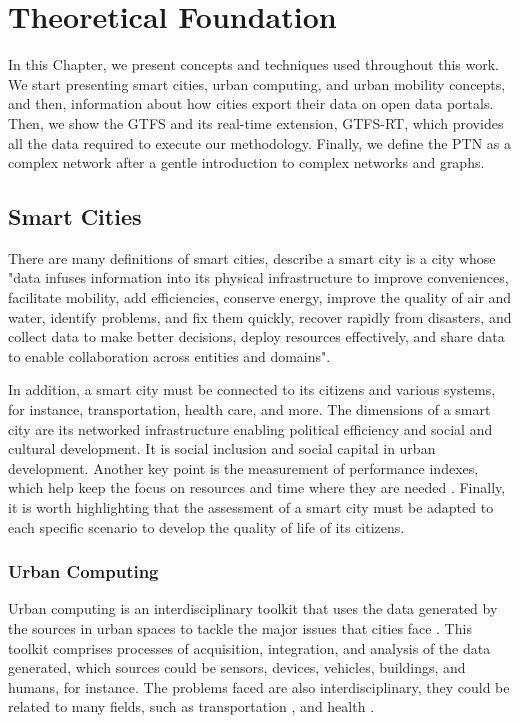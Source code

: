 \chapter{Theoretical Foundation}
\label{cap2}

\vspace{-1.9cm}

In this Chapter, we present concepts and techniques used throughout this work. We start
presenting smart cities, urban computing, and urban mobility concepts, and then,
information about how cities export their data 
on open data portals. Then, we show the GTFS
and its real-time extension, GTFS-RT,
which provides all the data required to execute our methodology.
Finally, we define the PTN as a complex network after 
a gentle introduction to complex networks and graphs.

\section{Smart Cities}
There are many definitions of smart cities,  describe
a smart city is a city whose "data infuses information into its physical infrastructure to improve
conveniences, facilitate mobility, add efficiencies, conserve energy,
improve the quality of air and water, identify problems, and fix them
quickly, recover rapidly from disasters, and collect data to make better
decisions, deploy resources effectively, and share data to enable
collaboration across entities and domains".

In addition, a smart city must be connected to its citizens and 
various systems, for instance, transportation, health care, and more.
The dimensions of a smart city are its networked infrastructure enabling
political efficiency and social and cultural development. It is social inclusion
and social capital in urban development. Another key point %
is the measurement of performance indexes, which help keep the focus 
on resources and time where they are needed \cite{smart_cities_SLR}. Finally, it is worth highlighting that the assessment of a smart city must be adapted to each 
specific scenario to develop the quality of life of its citizens.

\subsection{Urban Computing}
Urban computing is an interdisciplinary toolkit that uses the data generated by the sources in 
urban spaces to tackle the major issues that cities face \cite{urban_computing}. 
This toolkit comprises processes of acquisition, integration, and analysis of the data
generated, which sources could be sensors, devices, vehicles, buildings, and humans,
for instance. The problems faced are also interdisciplinary, they could be related to
many fields, such as 
transportation \cite{Silveira2015, 10.1145/3394486.3412856, GTFS-RT_delays_2017, GTFS-RT_delays_2022, routableTimetableGTFS, GTFS-RT_delays_2022-ADWIN}, 
and health \cite{Ro2020, Saran2020, Chang2020, Sonkin2020}.



